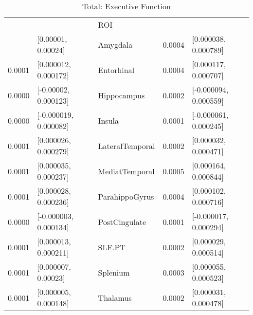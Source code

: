 \documentclass{article}
\begin{document}
\begin{table}[H]
\centering
\caption{Total: Executive Function} 
\begin{tabular}{rllrl}
  \toprule
\cellcolor{red!30}{B2} & \cellcolor{red!30}{CI} & ROI & \cellcolor{blue!30}{B3} & \cellcolor{blue!30}{CI} \\ 
  \rowcolor{green!30} \midrule
0.0001 & [0.00001, 0.00024] & Amygdala & 0.0004 & [0.000038, 0.000789] \\ 
   \rowcolor{green!30}0.0001 & [0.000012, 0.000172] & Entorhinal & 0.0004 & [0.000117, 0.000707] \\ 
  0.0000 & [-0.00002, 0.000123] & Hippocampus & 0.0002 & [-0.000094, 0.000559] \\ 
  0.0000 & [-0.000019, 0.000082] & Insula & 0.0001 & [-0.000061, 0.000245] \\ 
   \rowcolor{green!30}0.0001 & [0.000026, 0.000279] & LateralTemporal & 0.0002 & [0.000032, 0.000471] \\ 
   \rowcolor{green!30}0.0001 & [0.000035, 0.000237] & MediatTemporal & 0.0005 & [0.000164, 0.000844] \\ 
   \rowcolor{green!30}0.0001 & [0.000028, 0.000236] & ParahippoGyrus & 0.0004 & [0.000102, 0.000716] \\ 
  0.0000 & [-0.000003, 0.000134] & PostCingulate & 0.0001 & [-0.000017, 0.000294] \\ 
   \rowcolor{green!30}0.0001 & [0.000013, 0.000211] & SLF.PT & 0.0002 & [0.000029, 0.000514] \\ 
   \rowcolor{green!30}0.0001 & [0.000007, 0.00023] & Splenium & 0.0003 & [0.000055, 0.000523] \\ 
   \rowcolor{green!30}0.0001 & [0.000005, 0.000148] & Thalamus & 0.0002 & [0.000031, 0.000478] \\ 
   \bottomrule
\end{tabular}
\end{table}
\end{document}
